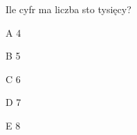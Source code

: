 \begin{tresc}
Ile cyfr ma liczba sto tysięcy?
\end{tresc}
\begin{wariant}{A} 4 \end{wariant}
\begin{wariant}{B} 5 \end{wariant}
\begin{wariant}{C} 6 \end{wariant}
\begin{wariant}{D} 7 \end{wariant}
\begin{wariant}{E} 8 \end{wariant}
